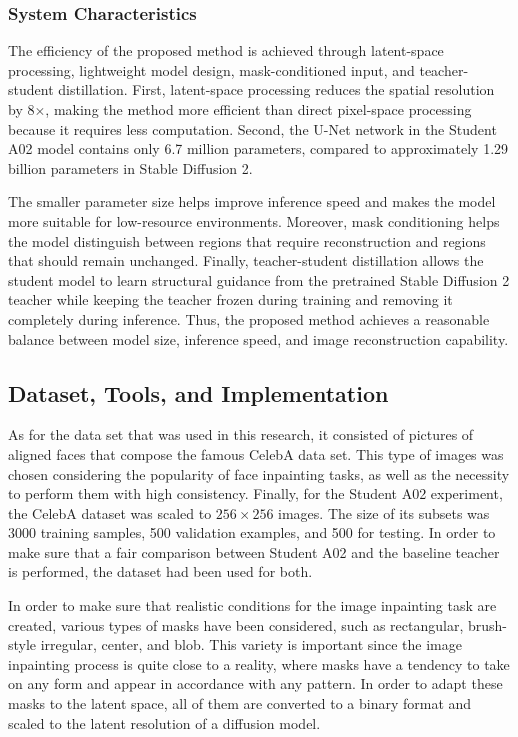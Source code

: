 \documentclass[journal]{IEEEtran}
\begin{document}
\subsubsection{System Characteristics}
The efficiency of the proposed method is achieved through latent-space processing, lightweight model design, mask-conditioned input, and teacher-student distillation. First, latent-space processing reduces the spatial resolution by 8$\times$, making the method more efficient than direct pixel-space processing because it requires less computation. Second, the U-Net network in the Student A02 model contains only 6.7 million parameters, compared to approximately 1.29 billion parameters in Stable Diffusion 2.

The smaller parameter size helps improve inference speed and makes the model more suitable for low-resource environments. Moreover, mask conditioning helps the model distinguish between regions that require reconstruction and regions that should remain unchanged. Finally, teacher-student distillation allows the student model to learn structural guidance from the pretrained Stable Diffusion 2 teacher while keeping the teacher frozen during training and removing it completely during inference. Thus, the proposed method achieves a reasonable balance between model size, inference speed, and image reconstruction capability.

\subsection{Dataset, Tools, and Implementation}
As for the data set that was used in this research, it consisted of pictures of aligned faces that compose the famous CelebA data set. This type of images was chosen considering the popularity of face inpainting tasks, as well as the necessity to perform them with high consistency. Finally, for the Student A02 experiment, the CelebA dataset was scaled to $256\times256$ images. The size of its subsets was 3000 training samples, 500 validation examples, and 500 for testing. In order to make sure that a fair comparison between Student A02 and the baseline teacher is performed, the dataset had been used for both.

In order to make sure that realistic conditions for the image inpainting task are created, various types of masks have been considered, such as rectangular, brush-style irregular, center, and blob. This variety is important since the image inpainting process is quite close to a reality, where masks have a tendency to take on any form and appear in accordance with any pattern. In order to adapt these masks to the latent space, all of them are converted to a binary format and scaled to the latent resolution of a diffusion model.
\end{document}
